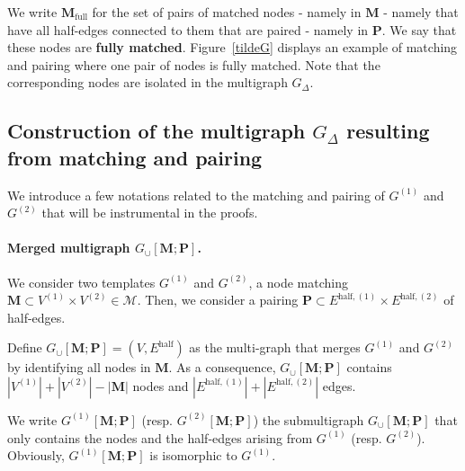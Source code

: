 \documentclass{article}
\newcommand{\alex}[1]{\textcolor{magenta}{[alex: #1]}}
\begin{document}


We write $\mathbf M_{\mathrm{full}}$ for the set of pairs of matched nodes - namely in $\mathbf M$ - namely that have all half-edges connected to them that are paired - namely in $\mathbf P$. We say that these nodes are {\bf fully matched}. Figure~\ref{tildeG} displays an example of matching and pairing where one pair of nodes is fully matched. Note that the corresponding nodes are isolated in the multigraph $G_{\Delta}$.










\subsection{Construction of the multigraph $G_{\Delta}$ resulting from matching and pairing}

We introduce a few notations related to the matching and pairing of $G^{(1)}$ and $G^{(2)}$ that will be instrumental in the proofs.



\paragraph{Merged multigraph $G_{\cup}[\mathbf{M};\mathbf{P}]$.} We consider two templates $G^{(1)}$ and $G^{(2)}$, a node matching $\mathbf{M}\subset V^{(1)}\times V^{(2)}\in \mathcal{M}$. Then, we consider a pairing $\mathbf{P}\subset E^{\mathrm{\mathrm{half}},(1)}\times E^{\mathrm{\mathrm{half}},(2)}$ of half-edges.



Define $G_{\cup}[\mathbf{M};\mathbf{P}]=(V,E^{\mathrm{\mathrm{half}}})$ as the multi-graph that merges $G^{(1)}$ and $G^{(2)}$ by identifying all nodes in $\mathbf{M}$. As a consequence, $G_{\cup}[\mathbf{M};\mathbf{P}]$ contains $|V^{(1)}|+|V^{(2)}|-|\mathbf{M}|$ nodes and $| E^{\mathrm{\mathrm{half}},(1)}| +|E^{\mathrm{\mathrm{half}},(2)}|$ edges. 

We write $G^{(1)}[\mathbf{M};\mathbf{P}]$ (resp. $G^{(2)}[\mathbf{M};\mathbf{P}]$) the submultigraph $G_{\cup}[\mathbf{M};\mathbf{P}]$ that only contains the nodes and the half-edges arising from $G^{(1)}$ (resp. $G^{(2)}$). Obviously, $G^{(1)}[\mathbf{M};\mathbf{P}]$ is isomorphic to $G^{(1)}$. 
\end{document}
